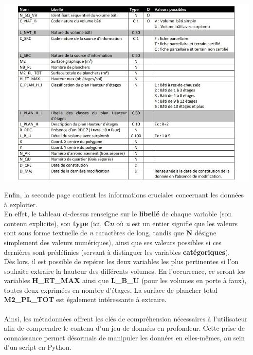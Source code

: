 \documentclass[
  11pt,
  french,
]{article}
\newcounter{customfigs}[section]
\newenvironment{customfigs}[1][] {
    \stepcounter{customfigs}
    Fig \arabic{section}. \arabic{customfigs} : }
\newcommand{\masked}{\vspace*{-\baselineskip}}
\begin{document}
\begin{tcolorbox}[title=\begin{customfigs} Table descriptive des variables issue des métadonnées \end{customfigs}]

\begin{center}\includegraphics[height=0.49\textheight]{__imgs/odp_meta2} \end{center}

\end{tcolorbox}

\hfill\break
Enfin, la seconde page contient les informations cruciales concernant
les données à exploiter.\\
En effet, le tableau ci-dessus renseigne sur le \textbf{libellé} de
chaque variable (son contenu explicite), son \textbf{type} (ici,
\textbf{C\emph{n}} où \emph{n} est un entier signifie que les valeurs
sont sous forme textuelle de \emph{n} caractères de long, tandis que
\textbf{N} désigne simplement des valeurs numériques), ainsi que ses
valeurs possibles si ces dernières sont prédéfinies (servant à
distinguer les variables \textbf{catégoriques}).\\
Dès lors, il est possible de repérer les deux variables les plus
pertinentes si l'on souhaite extraire la hauteur des différents volumes.
En l'occurrence, ce seront les variables \textbf{H\_ET\_MAX} ainsi que
\textbf{L\_B\_U} (pour les volumes en porte à faux), toutes deux
exprimées en nombre d'étages. La surface de plancher total
\textbf{M2\_PL\_TOT} est également intéressante à extraire.\\
~\\
Ainsi, les métadonnées offrent les clés de compréhension nécessaires à
l'utilisateur afin de comprendre le contenu d'un jeu de données en
profondeur. Cette prise de connaissance permet désormais de manipuler
les données en elles-mêmes, au sein d'un script en Python.
\end{document}
